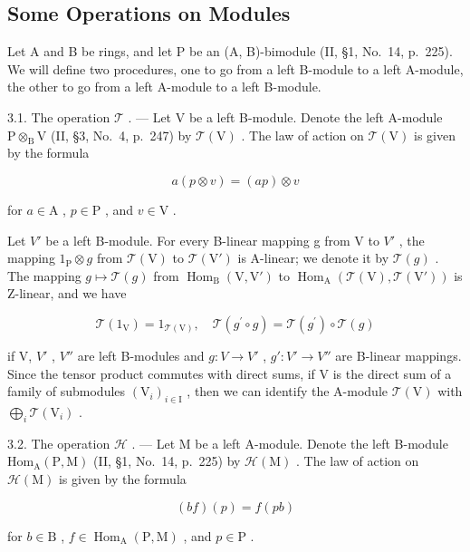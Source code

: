 \subsection{Some Operations on Modules}

Let A and B be rings, and let P be an (A, B)-bimodule (II, §1, No.~14, p.~225). We will define two procedures, one to go from a left B-module to a left A-module, the other to go from a left A-module to a left B-module.

3.1. The operation \(\mathcal{T}\) . --- Let V be a left B-module. Denote the left A-module \(\mathrm{P} \otimes_{\mathrm{B}} \mathrm{V}\) (II, §3, No.~4, p.~247) by \(\mathcal{T}(\mathrm{V})\) . The law of action on \(\mathcal{T}(\mathrm{V})\) is given by the formula

\[
a (p \otimes v) = (a p) \otimes v\tag{1}
\]

for \(a \in \mathrm{A}\) , \(p \in \mathrm{P}\) , and \(v \in \mathrm{V}\) .

Let \(V'\) be a left B-module. For every B-linear mapping g from V to \(V'\) , the mapping \(1_{\mathrm{P}} \otimes g\) from \(\mathcal{T}(\mathrm{V})\) to \(\mathcal{T}(\mathrm{V}')\) is A-linear; we denote it by \(\mathcal{T}(g)\) . The mapping \(g \mapsto \mathcal{T}(g)\) from \(\operatorname{Hom}_{\mathrm{B}}(\mathrm{V}, \mathrm{V}')\) to \(\operatorname{Hom}_{\mathrm{A}}(\mathcal{T}(\mathrm{V}), \mathcal{T}(\mathrm{V}'))\) is Z-linear, and we have

\[
\mathcal {T} (1 _ {\mathrm{V}}) = 1 _ {\mathcal {T} (\mathrm{V})}, \quad \mathcal {T} (g ^ {\prime} \circ g) = \mathcal {T} (g ^ {\prime}) \circ \mathcal {T} (g)\tag{2}
\]

if V, \(V'\) , \(V''\) are left B-modules and \(g : V \to V'\) , \(g' : V' \to V''\) are B-linear mappings. Since the tensor product commutes with direct sums, if V is the direct sum of a family of submodules \((\mathrm{V}_{i})_{i \in \mathrm{I}}\) , then we can identify the A-module \(\mathcal{T}(\mathrm{V})\) with \(\bigoplus_{i} \mathcal{T}(\mathrm{V}_{i})\) .

3.2. The operation \(\mathcal{H}\) . --- Let M be a left A-module. Denote the left B-module \(\mathrm{Hom}_{\mathrm{A}}(\mathrm{P},\mathrm{M})\) (II, §1, No.~14, p.~225) by \(\mathcal{H}(\mathrm{M})\) . The law of action on \(\mathcal{H}(\mathrm{M})\) is given by the formula

\[
(b f) (p) = f (p b)\tag{3}
\]

for \(b \in \mathrm{B}\) , \(f \in \operatorname{Hom}_{\mathrm{A}}(\mathrm{P}, \mathrm{M})\) , and \(p \in \mathrm{P}\) .

